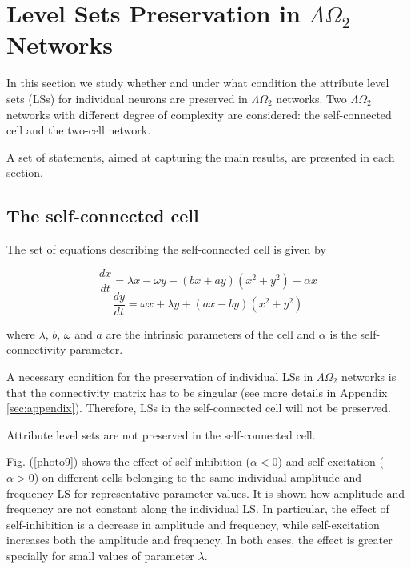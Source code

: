 \chapter{Level Sets Preservation in $\Lambda \Omega_{2}$ Networks}
\label{sec:results1}
In this section we study whether and under what condition the attribute level sets (LSs) for individual neurons are preserved in $\Lambda \Omega_{2}$ networks. Two $\Lambda \Omega_{2}$ networks with different degree of complexity are considered: the self-connected cell and the two-cell network.

A set of statements, aimed at capturing the main results, are presented in each section.

\section{The self-connected cell}
The set of equations describing the self-connected cell is given by

\begin{equation}
    \frac{dx}{dt} = \lambda x - \omega y - (bx + ay)(x^{2}+y^{2})+\alpha x
    \label{es11_1}
\end{equation}
\begin{equation}
    \frac{dy}{dt} = \omega x + \lambda y + (ax - by)(x^{2}+y^{2})
    \label{es11_2}
\end{equation}

where $\lambda$, $b$, $\omega$ and $a$ are the intrinsic parameters of the cell and $\alpha$ is the self-connectivity parameter.

A necessary condition for the preservation of individual LSs in $\Lambda \Omega_{2}$ networks is that the connectivity matrix has to be singular (see more details in Appendix \ref{sec:appendix}). Therefore, LSs in the self-connected cell will not be preserved.

\begin{Statement}
Attribute level sets are not preserved in the self-connected cell.
\end{Statement}

Fig. (\ref{photo9}) shows the effect of self-inhibition ($\alpha < 0$) and self-excitation ($\alpha > 0$) on different cells belonging to the same individual amplitude and frequency LS for representative parameter values. It is shown how amplitude and frequency are not constant along the individual LS. In particular, the effect of self-inhibition is a decrease in amplitude and frequency, while self-excitation increases both the amplitude and frequency. In both cases, the effect is greater specially for small values of parameter $\lambda$.

